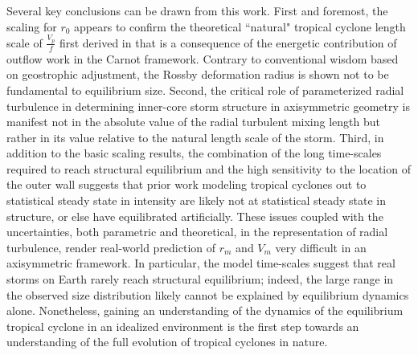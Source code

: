 \documentclass[12pt]{article}
\begin{document}
Several key conclusions can be drawn from this work. First and foremost, the scaling for $r_0$ appears to confirm the theoretical ``natural" tropical cyclone length scale of $\frac{V_p}{f}$ first derived in \cite{Emanuel_1986} that is a consequence of the energetic contribution of outflow work in the Carnot framework. Contrary to conventional wisdom based on geostrophic adjustment, the Rossby deformation radius is shown not to be fundamental to equilibrium size.  Second, the critical role of parameterized radial turbulence in determining inner-core storm structure in axisymmetric geometry is manifest not in the absolute value of the radial turbulent mixing length but rather in its value relative to the natural length scale of the storm. Third, in addition to the basic scaling results, the combination of the long time-scales required to reach structural equilibrium and the high sensitivity to the location of the outer wall suggests that prior work modeling tropical cyclones out to statistical steady state in intensity are likely not at statistical steady state in structure, or else have equilibrated artificially. These issues coupled with the uncertainties, both parametric and theoretical, in the representation of radial turbulence, render real-world prediction of $r_m$ and $V_m$ very difficult in an axisymmetric framework. In particular, the model time-scales suggest that real storms on Earth rarely reach structural equilibrium; indeed, the large range in the observed size distribution likely cannot be explained by equilibrium dynamics alone. Nonetheless, gaining an understanding of the dynamics of the equilibrium tropical cyclone in an idealized environment is the first step towards an understanding of the full evolution of tropical cyclones in nature.
\end{document}
